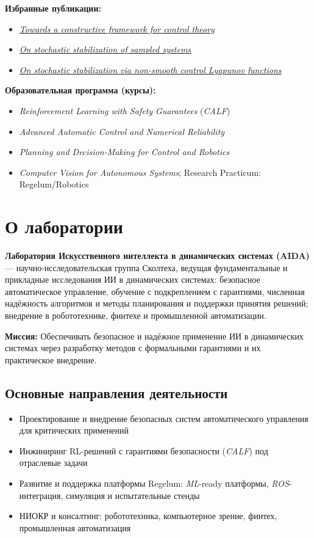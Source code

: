 \documentclass[12pt,a4paper]{article}
\begin{document}
\textbf{Избранные публикации:}
\begin{itemize}
    \item \href{https://arxiv.org/abs/2501.02267}{\textit{Towards a constructive framework for control theory}}
    \item \href{https://arxiv.org/abs/2105.07152}{\textit{On stochastic stabilization of sampled systems}}
    \item \href{https://arxiv.org/abs/2205.13409}{\textit{On stochastic stabilization via non-smooth control Lyapunov functions}}
\end{itemize}

\textbf{Образовательная программа (курсы):}
\begin{itemize}
    \item \textit{Reinforcement Learning with Safety Guarantees} (\textit{CALF})
    \item \textit{Advanced Automatic Control and Numerical Reliability}
    \item \textit{Planning and Decision-Making for Control and Robotics}
    \item \textit{Computer Vision for Autonomous Systems}; Research Practicum: Regelum/Robotics
\end{itemize}

\section{О лаборатории}

\textbf{Лаборатория Искусственного интеллекта в динамических системах (AIDA)} --- научно-исследовательская группа Сколтеха, ведущая фундаментальные и прикладные исследования ИИ в динамических системах: безопасное автоматическое управление, обучение с подкреплением с гарантиями, численная надёжность алгоритмов и методы планирования и поддержки принятия решений; внедрение в робототехнике, финтехе и промышленной автоматизации.

\textbf{Миссия:} Обеспечивать безопасное и надёжное применение ИИ в динамических системах через разработку методов с формальными гарантиями и их практическое внедрение.

\subsection*{Основные направления деятельности}
\begin{itemize}
    \item Проектирование и внедрение безопасных систем автоматического управления для критических применений
    \item Инжиниринг RL-решений с гарантиями безопасности (\textit{CALF}) под отраслевые задачи
    \item Развитие и поддержка платформы Regelum: \textit{ML}-ready платформы, \textit{ROS}-интеграция, симуляция и испытательные стенды
    \item НИОКР и консалтинг: робототехника, компьютерное зрение, финтех, промышленная автоматизация
\end{itemize}
\end{document}
